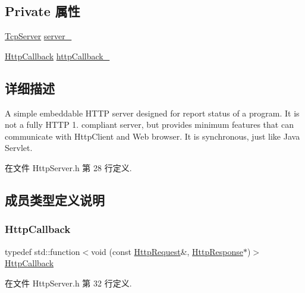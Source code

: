 \subsection*{Private 属性}
\begin{DoxyCompactItemize}
\item 
\hyperlink{classmuduo_1_1net_1_1TcpServer}{Tcp\+Server} \hyperlink{classmuduo_1_1net_1_1HttpServer_a5fa2c354b57a31cc2b5ed74583f853ad}{server\+\_\+}
\item 
\hyperlink{classmuduo_1_1net_1_1HttpServer_ab343d6a3f751b7fb50940f92c64b6578}{Http\+Callback} \hyperlink{classmuduo_1_1net_1_1HttpServer_ab296b28a88834c853b076a5a25ba76a7}{http\+Callback\+\_\+}
\end{DoxyCompactItemize}


\subsection{详细描述}
A simple embeddable H\+T\+TP server designed for report status of a program. It is not a fully H\+T\+TP 1. compliant server, but provides minimum features that can communicate with Http\+Client and Web browser. It is synchronous, just like Java Servlet. 

在文件 Http\+Server.\+h 第 28 行定义.



\subsection{成员类型定义说明}
\mbox{\label{classmuduo_1_1net_1_1HttpServer_ab343d6a3f751b7fb50940f92c64b6578}} 
\subsubsection{\texorpdfstring{Http\+Callback}{HttpCallback}}
{\footnotesize\ttfamily typedef std\+::function$<$void (const \hyperlink{classmuduo_1_1net_1_1HttpRequest}{Http\+Request}\&, \hyperlink{classmuduo_1_1net_1_1HttpResponse}{Http\+Response}$\ast$)$>$ \hyperlink{classmuduo_1_1net_1_1HttpServer_ab343d6a3f751b7fb50940f92c64b6578}{Http\+Callback}}



在文件 Http\+Server.\+h 第 32 行定义.



